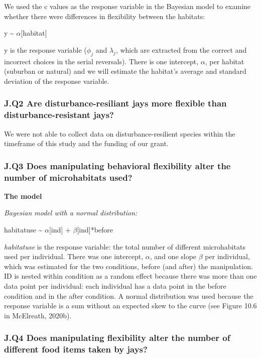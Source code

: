 \documentclass[
]{article}
\begin{document}
We used the c values as the response variable in the Bayesian model to
examine whether there were differences in flexibility between the
habitats:

y \textasciitilde{} \(\alpha\){[}habitat{]}

y is the response variable (\(\phi_j\) and \(\lambda_j\), which are
extracted from the correct and incorrect choices in the serial
reversals). There is one intercept, \(\alpha\), per habitat (suburban or
natural) and we will estimate the habitat's average and standard
deviation of the response variable.

\subsubsection{J.Q2 Are disturbance-resiliant jays more flexible than
disturbance-resistant
jays?}\label{j.q2-are-disturbance-resiliant-jays-more-flexible-than-disturbance-resistant-jays}

We were not able to collect data on disturbance-resilient species within
the timeframe of this study and the funding of our grant.

\subsubsection{J.Q3 Does manipulating behavioral flexibility alter the
number of microhabitats
used?}\label{j.q3-does-manipulating-behavioral-flexibility-alter-the-number-of-microhabitats-used}

\textbf{The model}

\emph{Bayesian model with a normal distribution:}

habitatuse \textasciitilde{} \(\alpha\){[}ind{]} +
\(\beta\){[}ind{]}*before

\emph{habitatuse} is the response variable: the total number of
different microhabitats used per individual. There was one intercept,
\(\alpha\), and one slope \(\beta\) per individual, which was estimated
for the two conditions, before (and after) the manipulation. ID is
nested within condition as a random effect because there was more than
one data point per individual: each individual has a data point in the
before condition and in the after condition. A normal distribution was
used because the response variable is a sum without an expected skew to
the curve (see Figure 10.6 in McElreath, 2020b).

\subsubsection{J.Q4 Does manipulating flexibility alter the number of
different food items taken by
jays?}\label{j.q4-does-manipulating-flexibility-alter-the-number-of-different-food-items-taken-by-jays}
\end{document}
